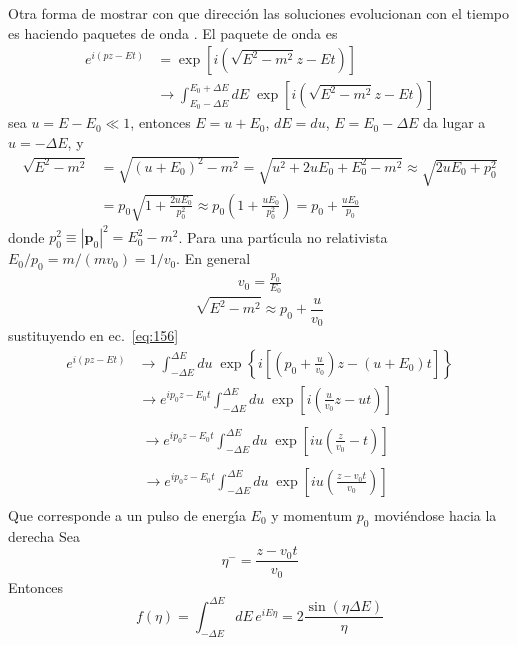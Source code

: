 Otra forma de mostrar con que direcci\'on las soluciones evolucionan con el tiempo es haciendo paquetes de onda \cite{Gross}. El paquete de onda es
\begin{align}
  \label{eq:156}
  e^{i(pz-Et)}&=\exp\left[i\left(\sqrt{E^2-m^2}z-Et\right)\right]\nonumber\\
  &\to\int_{E_0-\Delta E}^{E_0+\Delta E}dE\;\exp\left[i\left(\sqrt{E^2-m^2}z-Et\right)\right]
\end{align}
sea $u=E-E_0\ll1$, entonces $E=u+E_0$, $dE=du$, $E=E_0-\Delta E$ da lugar a $u=-\Delta E$, y
\begin{align}
  \sqrt{E^2-m^2}&=\sqrt{(u+E_0)^2-m^2}=\sqrt{u^2+2uE_0+E_0^2-m^2}\approx\sqrt{2uE_0+p_0^2}\nonumber\\
  &=p_0\sqrt{1+\frac{2uE_0}{p_0^2}}\approx p_0(1+\frac{uE_0}{p_0^2})=p_0+\frac{uE_0}{p_0}
\end{align}
donde $p_0^2\equiv|\mathbf{p}_0|^2=E_0^2-m^2$. Para una part\'\i cula no relativista $E_0/p_0=m/(mv_0)=1/v_0$. En general
\begin{align}
  v_0=\frac{p_0}{E_0}
\end{align}
\begin{equation}
  \sqrt{E^2-m^2}\approx p_0+\frac{u}{v_0}
\end{equation}
sustituyendo en ec.~\eqref{eq:156}
\begin{align}
  e^{i(pz-Et)}&\to\int_{-\Delta E}^{\Delta E}du\;\exp\left\{i\left[\left(p_0+\frac{u}{v_0}\right)z-(u+E_0)t\right]\right\}
\end{align}
\begin{align}
  &\to e^{ip_0z-E_0t}\int_{-\Delta E}^{\Delta E}du\;\exp\left[i\left(\frac{u}{v_0}z-ut\right)\right]\nonumber\\
\end{align}
\begin{align}
    &\to e^{ip_0z-E_0t}\int_{-\Delta E}^{\Delta E}du\;\exp\left[iu\left(\frac{z}{v_0}-t\right)\right]\nonumber\\
\end{align}
\begin{align}
    &\to e^{ip_0z-E_0t}\int_{-\Delta E}^{\Delta E}du\;\exp\left[iu\left(\frac{z-v_0t}{v_0}\right)\right]\nonumber\\
\end{align}
Que corresponde a un pulso de energ\'\i a $E_0$ y momentum $p_0$ movi\'endose hacia la derecha
Sea
\begin{equation}
  \eta^-=\frac{z-v_0t}{v_0}
\end{equation}
Entonces
\begin{equation}
  f(\eta)=\int_{-\Delta E}^{\Delta E}dE\,e^{iE\eta}=2\frac{\sin(\eta\Delta E)}{\eta}
\end{equation}


